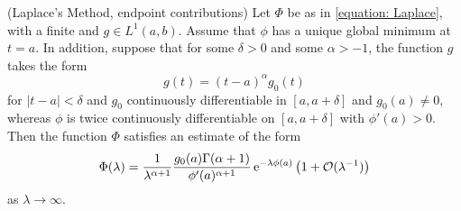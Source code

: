 \begin{thm}
	(Laplace's Method, endpoint contributions) Let $\Phi$ be as in \ref{equation: Laplace}, with a finite and $g \in L^1(a,b)$. Assume that $\phi$ has a unique global minimum at $t=a$. In addition, suppose that for some $\delta > 0$ and some $\alpha > -1$, the function $g$ takes the form
	$$ g(t) = (t-a)^{\alpha} g_0(t)$$
	for $|t-a| < \delta$ and $g_0$ continuously differentiable in $[a, a+\delta]$ and $g_0(a) \neq 0$, whereas $\phi$ is twice continuously differentiable on $[a, a+\delta]$ with $\phi'(a) > 0$. Then the function $\Phi$ satisfies an estimate of the form
	\begin{equation}
		\Phi(\lambda) = \frac{1}{\lambda^{\alpha + 1}} \frac{g_0(a) \Gamma(\alpha + 1)}{\phi'(a)^{\alpha + 1}} \operatorname{e}^{-\lambda \phi(a)} \left(1+\mathcal{O}(\lambda^{-1})\right)
	\end{equation}
	as $\lambda \rightarrow \infty$.
\end{thm}

